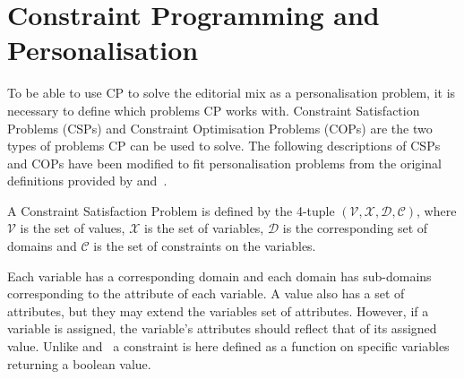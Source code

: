 \section{Constraint Programming and Personalisation}
To be able to use CP to solve the editorial mix as a personalisation problem, it is necessary to define which problems CP works with. Constraint Satisfaction Problems (CSPs) and Constraint Optimisation Problems (COPs) are the two types of problems CP can be used to solve. The following descriptions of CSPs and COPs have been modified to fit personalisation problems from the original definitions provided by  and~\cite{CPApt}.

A Constraint Satisfaction Problem is defined by the 4-tuple $(\mathcal{V}, \mathcal{X}, \mathcal{D}, \mathcal{C})$, where $\mathcal{V}$ is the set of values, $\mathcal{X}$ is the set of variables, $\mathcal{D}$ is the corresponding set of domains and $\mathcal{C}$ is the set of constraints on the variables.

Each variable has a corresponding domain and each domain has sub-domains corresponding to the attribute of each variable. A value also has a set of attributes, but they may extend the variables set of attributes. However, if a variable is assigned, the variable's attributes should reflect that of its assigned value\vspace{-40pt}\vspace{40pt}\hspace{-.6em}. Unlike  and~\cite{CPApt} a constraint is here defined as a function on specific variables returning a boolean value.

